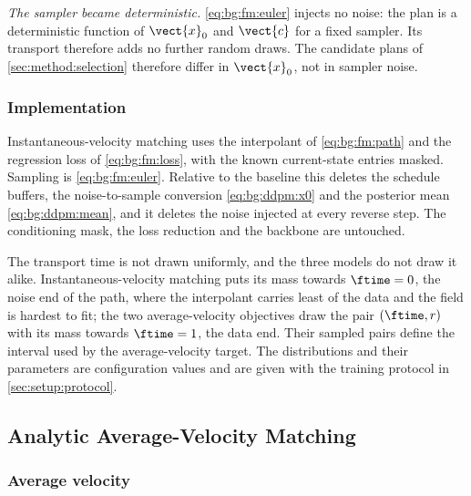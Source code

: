 \emph{The sampler became deterministic.} \eqref{eq:bg:fm:euler} injects no noise: the plan is
a deterministic function of $\vect{x}_{0}$ and $\vect{c}$ for a fixed sampler. Its transport
therefore adds no further random draws. The candidate plans of
\autoref{sec:method:selection} therefore differ in $\vect{x}_{0}$, not in sampler noise.

\subsubsection*{Implementation}

Instantaneous-velocity matching uses the interpolant of \eqref{eq:bg:fm:path} and the regression
loss of \eqref{eq:bg:fm:loss}, with the known current-state entries masked.
Sampling is \eqref{eq:bg:fm:euler}. Relative to the baseline this deletes the schedule buffers,
the noise-to-sample conversion \eqref{eq:bg:ddpm:x0} and the posterior mean
\eqref{eq:bg:ddpm:mean}, and it deletes the noise injected at every reverse step. The
conditioning mask, the loss reduction and the backbone are untouched.

The transport time is not drawn uniformly, and the three models do not draw it alike.
Instantaneous-velocity matching puts its mass towards $\ftime = 0$, the noise end of the path,
where the interpolant carries least of the data and the field is hardest to fit; the two
average-velocity objectives draw the pair $(\ftime,r)$ with its mass towards $\ftime = 1$, the data
end. Their sampled pairs define the interval used by the average-velocity target. The distributions and their parameters
are configuration values and are given with the training protocol in
\autoref{sec:setup:protocol}.

\subsection{Analytic Average-Velocity Matching}\label{sec:method:meanflow}

\subsubsection*{Average velocity}

